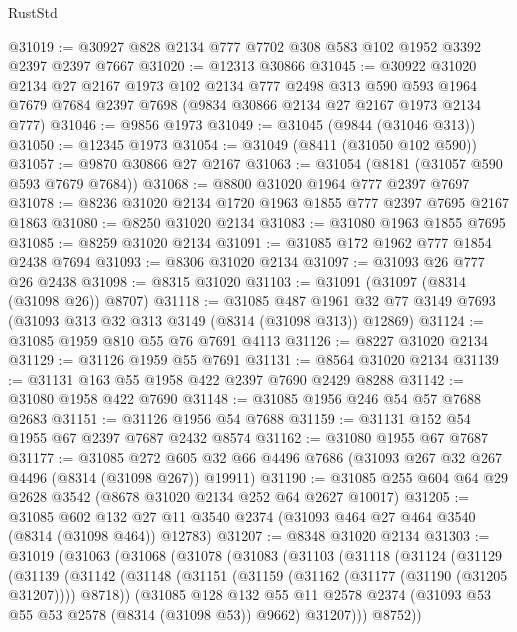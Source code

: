 \begin{lexlean}{RustStd}
\begin{coremodule}
@31019 := @30927 @828 @2134 @777 @7702 @308 @583 @102 @1952 @3392 @2397 @2397 @7667
@31020 := @12313 @30866
@31045 := @30922
    @31020
    @2134
    @27
    @2167
    @1973
    @102
    @2134
    @777
    @2498
    @313
    @590
    @593
    @1964
    @7679
    @7684
    @2397
    @7698
    (@9834 @30866 @2134 @27 @2167 @1973 @2134 @777)
@31046 := @9856 @1973
@31049 := @31045 (@9844 (@31046 @313))
@31050 := @12345 @1973
@31054 := @31049 (@8411 (@31050 @102 @590))
@31057 := @9870 @30866 @27 @2167
@31063 := @31054 (@8181 (@31057 @590 @593 @7679 @7684))
@31068 := @8800 @31020 @1964 @777 @2397 @7697
@31078 := @8236 @31020 @2134 @1720 @1963 @1855 @777 @2397 @7695 @2167 @1863
@31080 := @8250 @31020 @2134
@31083 := @31080 @1963 @1855 @7695
@31085 := @8259 @31020 @2134
@31091 := @31085 @172 @1962 @777 @1854 @2438 @7694
@31093 := @8306 @31020 @2134
@31097 := @31093 @26 @777 @26 @2438
@31098 := @8315 @31020
@31103 := @31091 (@31097 (@8314 (@31098 @26)) @8707)
@31118 := @31085
    @487
    @1961
    @32
    @77
    @3149
    @7693
    (@31093 @313 @32 @313 @3149 (@8314 (@31098 @313)) @12869)
@31124 := @31085 @1959 @810 @55 @76 @7691 @4113
@31126 := @8227 @31020 @2134
@31129 := @31126 @1959 @55 @7691
@31131 := @8564 @31020 @2134
@31139 := @31131 @163 @55 @1958 @422 @2397 @7690 @2429 @8288
@31142 := @31080 @1958 @422 @7690
@31148 := @31085 @1956 @246 @54 @57 @7688 @2683
@31151 := @31126 @1956 @54 @7688
@31159 := @31131 @152 @54 @1955 @67 @2397 @7687 @2432 @8574
@31162 := @31080 @1955 @67 @7687
@31177 := @31085
    @272
    @605
    @32
    @66
    @4496
    @7686
    (@31093 @267 @32 @267 @4496 (@8314 (@31098 @267)) @19911)
@31190 := @31085 @255 @604 @64 @29 @2628 @3542 (@8678 @31020 @2134 @252 @64 @2627 @10017)
@31205 := @31085
    @602
    @132
    @27
    @11
    @3540
    @2374
    (@31093 @464 @27 @464 @3540 (@8314 (@31098 @464)) @12783)
@31207 := @8348 @31020 @2134
@31303 := @31019
    (@31063
      (@31068
        (@31078
          (@31083
            (@31103
              (@31118
                (@31124
                  (@31129
                    (@31139
                      (@31142
                        (@31148
                          (@31151 (@31159 (@31162 (@31177 (@31190 (@31205 @31207)))) @8718))
                          (@31085
                            @128
                            @132
                            @55
                            @11
                            @2578
                            @2374
                            (@31093 @53 @55 @53 @2578 (@8314 (@31098 @53)) @9662)
                            @31207)))
                      @8752))

\end{coremodule}
\end{lexlean}
